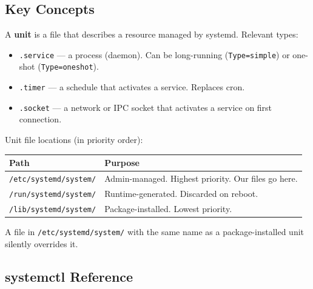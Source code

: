\documentclass[11pt,a4paper]{article}
\begin{document}
\subsection{Key Concepts}

A \textbf{unit} is a file that describes a resource managed by systemd. Relevant types:

\begin{itemize}
  \item \texttt{.service} — a process (daemon). Can be long-running (\texttt{Type=simple}) or one-shot (\texttt{Type=oneshot}).
  \item \texttt{.timer} — a schedule that activates a service. Replaces cron.
  \item \texttt{.socket} — a network or IPC socket that activates a service on first connection.
\end{itemize}

Unit file locations (in priority order):

\begin{center}
\begin{tabular}{L{5.5cm}L{7.5cm}}
\toprule
\textbf{Path} & \textbf{Purpose} \\
\midrule
\texttt{/etc/systemd/system/}    & Admin-managed. Highest priority. Our files go here. \\
\texttt{/run/systemd/system/}    & Runtime-generated. Discarded on reboot. \\
\texttt{/lib/systemd/system/}    & Package-installed. Lowest priority. \\
\bottomrule
\end{tabular}
\end{center}

A file in \texttt{/etc/systemd/system/} with the same name as a package-installed unit silently overrides it.

\subsection{systemctl Reference}
\end{document}
